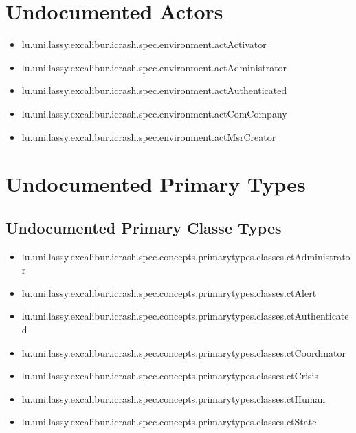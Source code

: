\section[Undocumented Actors]{Undocumented Actors}
\begin{itemize}
\item lu.uni.lassy.excalibur.icrash.spec.environment.actActivator 
\item lu.uni.lassy.excalibur.icrash.spec.environment.actAdministrator 
\item lu.uni.lassy.excalibur.icrash.spec.environment.actAuthenticated 
\item lu.uni.lassy.excalibur.icrash.spec.environment.actComCompany 
\item lu.uni.lassy.excalibur.icrash.spec.environment.actMsrCreator 
\end{itemize}




\section[Undocumented Primary Types]{Undocumented Primary Types}

\subsection[Undocumented Primary Classe Types]{Undocumented Primary Classe Types}
\begin{itemize}
\item lu.uni.lassy.excalibur.icrash.spec.concepts.primarytypes.classes.ctAdministrator 
\item lu.uni.lassy.excalibur.icrash.spec.concepts.primarytypes.classes.ctAlert 
\item lu.uni.lassy.excalibur.icrash.spec.concepts.primarytypes.classes.ctAuthenticated 
\item lu.uni.lassy.excalibur.icrash.spec.concepts.primarytypes.classes.ctCoordinator 
\item lu.uni.lassy.excalibur.icrash.spec.concepts.primarytypes.classes.ctCrisis 
\item lu.uni.lassy.excalibur.icrash.spec.concepts.primarytypes.classes.ctHuman 
\item lu.uni.lassy.excalibur.icrash.spec.concepts.primarytypes.classes.ctState 
\end{itemize}

